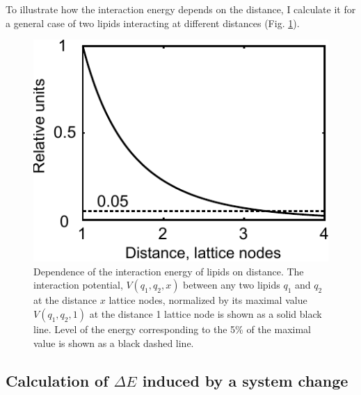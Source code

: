 To illustrate how the interaction energy depends on the distance, I calculate it for a general case of two lipids interacting at different distances (Fig. \ref{fig:yukawa_lipid_energies}).
\begin{figure}[!ht]
\begin{center}
  \includegraphics[scale=1.2]{../figures/yukawa_lipid_energies1.pdf}
\end{center}
 \caption[Dependence of the interaction energy of lipids on distance]{Dependence of the interaction energy of lipids on distance. The interaction potential, $V(q_1,q_2,x)$ between any two lipids $q_1$ and $q_2$ at the distance $x$ lattice nodes, normalized by its maximal value $V(q_1,q_2,1)$ at the distance 1 lattice node is shown as a solid black line. Level of the energy corresponding to the 5\% of the maximal value is shown as a black dashed line.}
\label{fig:yukawa_lipid_energies}
\end{figure}

\subsection{Calculation of $\Delta E$ induced by a system change}

\label{delta_energy_calculation}

